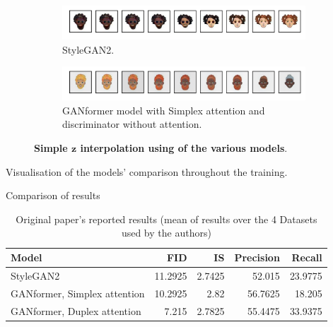 \documentclass{article}
\begin{document}
	\begin{figure}[htpb]
		\centering
		\begin{subfigure}{\linewidth}
			\includegraphics[width=\linewidth]{../src/trained_network/out_imgs/interpolation_Stylegan2_300kimg.png}
			\vspace{-7mm}
			\caption{StyleGAN2.} 
		\end{subfigure}
		\begin{subfigure}{\linewidth}
			\includegraphics[width=\linewidth]{../src/trained_network/out_imgs/interpolation_GANFormer_Simplex_D_StyleGAN_300kimg.png}
			\vspace{-7mm}
			\caption{GANformer model with Simplex attention and discriminator without attention.}
		\end{subfigure}
		\vspace{3mm}
		\caption{\textbf{Simple $\mathbf{z}$ interpolation using of the various 
		models}.}\label{fig:interpolation}
	\end{figure}

	Visualisation of the models' comparison throughout the training. 


    Comparison of results
    
    \begin{table}[htb]
    	\centering
        \caption{Original paper's reported results (mean of results over the 4 Datasets used by the authors)}
        \label{tab:orig-results}
        \vspace{3mm}
        \small
        \begin{tabular}{l|rrrr}
	        \toprule
	        Model                        & FID  & IS & Precision  & Recall \\ 
	        \midrule
	        StyleGAN2                    & 11.2925 & 2.7425 & 52.015      & 23.9775   \\ 
	        GANformer, Simplex attention & 10.2925 & 2.82   & 56.7625     & 18.205    \\ 
	        GANformer, Duplex attention  & 7.215   & 2.7825 & 55.4475     & 33.9375   \\ 
	        \bottomrule
        \end{tabular}
        \end{table}
\end{document}
